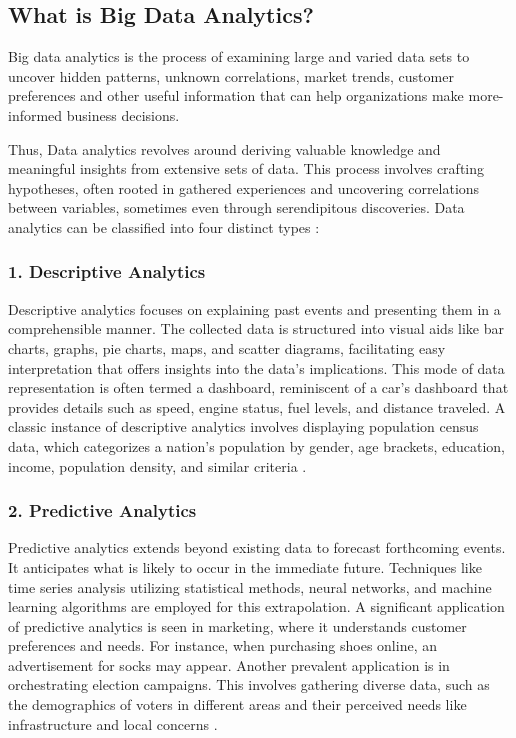\subsection{What is Big Data Analytics?}

Big data analytics is the process of examining large and varied data sets to uncover hidden patterns, unknown correlations, market trends, customer preferences and other useful information that can help organizations make more-informed business decisions.

Thus, Data analytics revolves around deriving valuable knowledge and meaningful insights from extensive sets of data.
This process involves crafting hypotheses, often rooted in gathered experiences and uncovering correlations between variables, sometimes even through serendipitous discoveries.
Data analytics can be classified into four distinct types \autocite{rajaraman2016big}:

\subsubsection{1. Descriptive Analytics}

Descriptive analytics focuses on explaining past events and presenting them in a comprehensible manner.
The collected data is structured into visual aids like bar charts, graphs, pie charts, maps, and scatter diagrams, facilitating easy interpretation that offers insights into the data's implications.
This mode of data representation is often termed a dashboard, reminiscent of a car's dashboard that provides details such as speed, engine status, fuel levels, and distance traveled.
A classic instance of descriptive analytics involves displaying population census data, which categorizes a nation's population by gender, age brackets, education, income, population density, and similar criteria \autocite{rajaraman2016big}.

\subsubsection{2. Predictive Analytics}

Predictive analytics extends beyond existing data to forecast forthcoming events.
It anticipates what is likely to occur in the immediate future.
Techniques like time series analysis utilizing statistical methods, neural networks, and machine learning algorithms are employed for this extrapolation.
A significant application of predictive analytics is seen in marketing, where it understands customer preferences and needs.
For instance, when purchasing shoes online, an advertisement for socks may appear.
Another prevalent application is in orchestrating election campaigns.
This involves gathering diverse data, such as the demographics of voters in different areas and their perceived needs like infrastructure and local concerns \autocite{rajaraman2016big}.

